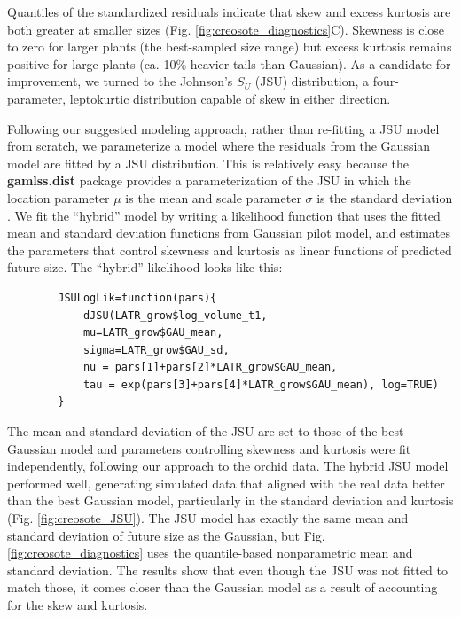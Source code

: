 \documentclass[12pt]{article}
\begin{document}
\begin{spacing}{1.35}
	
	Quantiles of the standardized residuals indicate that skew and excess kurtosis are both greater at smaller sizes (Fig. \ref{fig:creosote_diagnostics}C).
	Skewness is close to zero for larger plants (the best-sampled size range) but excess kurtosis remains positive for large plants (ca. 10\% heavier tails than Gaussian). 
	As a candidate for improvement, we turned to the Johnson's $S_{U}$ (JSU) distribution, a four-parameter, leptokurtic distribution capable of skew in either direction. 
	
	Following our suggested modeling approach, rather than re-fitting a JSU model from scratch, we parameterize a model where the residuals from the Gaussian model are fitted by a JSU distribution. 
	This is relatively easy because the \textbf{gamlss.dist} package provides a parameterization of the JSU in which the location parameter $\mu$ is the mean and scale parameter $\sigma$ is the standard deviation \citep{rigby2019distributions}. 
	We fit the ``hybrid'' model by writing a likelihood function that uses the fitted mean and standard deviation functions from Gaussian pilot model, and estimates the parameters that control skewness and kurtosis as linear functions of predicted future size.   
	The ``hybrid'' likelihood looks like this:
	\begin{lstlisting}
		JSULogLik=function(pars){
			dJSU(LATR_grow$log_volume_t1, 
			mu=LATR_grow$GAU_mean,
			sigma=LATR_grow$GAU_sd,
			nu = pars[1]+pars[2]*LATR_grow$GAU_mean,
			tau = exp(pars[3]+pars[4]*LATR_grow$GAU_mean), log=TRUE)
		}
	\end{lstlisting}
	
	The mean and standard deviation of the JSU are set to those of the best Gaussian model and parameters controlling skewness and kurtosis were fit independently, following our approach to the orchid data. 
	The hybrid JSU model performed well, generating simulated data that aligned with the real data better than the best Gaussian model, particularly in the standard deviation and kurtosis (Fig. \ref{fig:creosote_JSU}). 
	The JSU model has exactly the same mean and standard deviation of future size as the Gaussian, but Fig. \ref{fig:creosote_diagnostics} uses the quantile-based nonparametric mean and standard deviation. 
	The results show that even though the JSU was not fitted to match those, it comes closer than the Gaussian model as a result of accounting for the skew and kurtosis.
	

\end{spacing}
\end{document}
